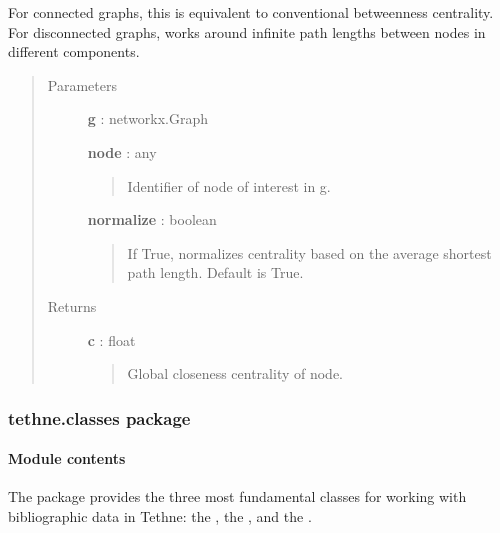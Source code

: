 \documentclass[letterpaper,10pt,english]{sphinxmanual}
\begin{document}
\begin{fulllineitems}
For connected graphs, this is equivalent to conventional betweenness
centrality. For disconnected graphs, works around infinite path lengths
between nodes in different components.
\begin{quote}\begin{description}
\item[{Parameters}] \leavevmode
\textbf{g} : networkx.Graph

\textbf{node} : any
\begin{quote}

Identifier of node of interest in g.
\end{quote}

\textbf{normalize} : boolean
\begin{quote}

If True, normalizes centrality based on the average shortest path
length. Default is True.
\end{quote}

\item[{Returns}] \leavevmode
\textbf{c} : float
\begin{quote}

Global closeness centrality of node.
\end{quote}

\end{description}\end{quote}

\end{fulllineitems}



\subsubsection{tethne.classes package}
\label{tethne.classes:tethne-classes-package}\label{tethne.classes::doc}

\paragraph{Module contents}
\label{tethne.classes:module-contents}\label{tethne.classes:module-tethne.classes}
The {\hyperref[tethne.classes:module-tethne.classes]{}} package provides the three most fundamental classes for
working with bibliographic data in Tethne: the {\hyperref[tethne.classes.paper:tethne.classes.paper.Paper]{}}, the
{\hyperref[tethne.classes.corpus:tethne.classes.corpus.Corpus]{}}, and the {\hyperref[tethne.classes.graphcollection:tethne.classes.graphcollection.GraphCollection]{}}.
\end{document}

